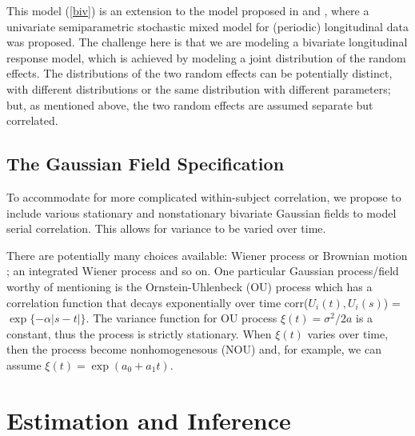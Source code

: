 \documentclass[12pt, notitlepage]{article}
\begin{document}
This model (\ref{biv}) is an extension to the model proposed in \citet {Zhang:1998} and \citet {Zhan:Lin:Sowe:quan:2000}, where a univariate semiparametric stochastic mixed model for (periodic) longitudinal data was proposed. The challenge here is that we are modeling a bivariate longitudinal response model, which  is achieved  by modeling a joint distribution of the random effects. The distributions of the two random effects can be potentially distinct, with different distributions or the same distribution with different parameters; but, as mentioned above,  the two random effects are  assumed separate but correlated. 


\subsection{The Gaussian Field Specification}

To accommodate for more complicated within-subject correlation, we propose to include various stationary and nonstationary bivariate Gaussian fields to model serial correlation. This allows for variance to be varied over time. 

There are potentially many choices available: Wiener process or Brownian motion \citep{Tayl:Cumb:Sy:quan:1994}; an integrated Wiener process and so on. One particular Gaussian process/field worthy of mentioning is the Ornstein-Uhlenbeck (OU) process \citep{Koralov:2007} which has a correlation function that decays exponentially over time corr($U_i(t), U_i(s)$) = $\exp\{-\alpha|s-t|\}$. The variance function for OU process $\xi(t) = \sigma^2/2a$ is a constant, thus the process is strictly stationary. When $\xi(t)$ varies over time, then the process become nonhomogenesous (NOU) and, for example, we can assume $\xi(t) = \exp(a_0 + a_1 t)$. 



%
%
%

\section{Estimation and Inference} \label{est}

\end{document}
